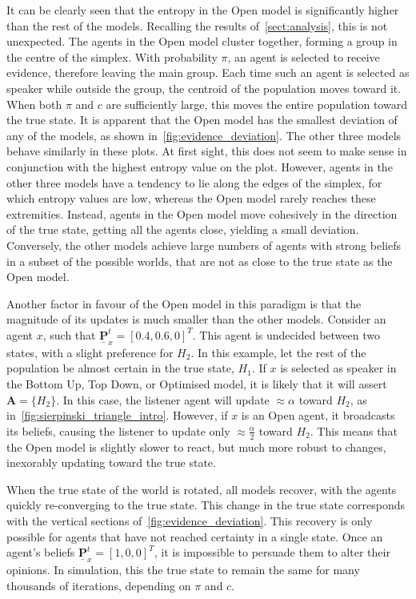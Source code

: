 It can be clearly seen that the entropy in the Open model is significantly higher than the rest of the models. Recalling the results of~\cref{sect:analysis}, this is not unexpected. The agents in the Open model cluster together, forming a group in the centre of the simplex. With probability $\pi$, an agent is selected to receive evidence, therefore leaving the main group. Each time such an agent is selected as speaker while outside the group, the centroid of the population moves toward it. When both $\pi$ and $c$ are sufficiently large, this moves the entire population toward the true state. It is apparent that the Open model has the smallest deviation of any of the models, as shown in~\cref{fig:evidence_deviation}. The other three models behave similarly in these plots. At first sight, this does not seem to make sense in conjunction with the highest entropy value on the plot. However, agents in the other three models have a tendency to lie along the edges of the simplex, for which entropy values are low, whereas the Open model rarely reaches these extremities. Instead, agents in the Open model move cohesively in the direction of the true state, getting all the agents close, yielding a small deviation. Conversely, the other models achieve large numbers of agents with strong beliefs in a subset of the possible worlds, that are not as close to the true state as the Open model. 

Another factor in favour of the Open model in this paradigm is that the magnitude of its updates is much smaller than the other models. Consider an agent $x$, such that $\underline{\mathbf{P}}^t_x = [0.4, 0.6, 0]^T$. This agent is undecided between two states, with a slight preference for $H_2$. In this example, let the rest of the population be almost certain in the true state, $H_1$. If $x$ is selected as speaker in the Bottom Up, Top Down, or Optimised model, it is likely that it will assert $\mathbf{A} = \{ H_2 \}$. In this case, the listener agent will update $\approx \alpha$ toward $H_2$, as in~\cref{fig:sierpinski_triangle_intro}. However, if $x$ is an Open agent, it broadcasts its beliefs, causing the listener to update only $\approx \frac{\alpha}{2}$ toward $H_2$. This means that the Open model is slightly slower to react, but much more robust to changes, inexorably updating toward the true state.  

When the true state of the world is rotated, all models recover, with the agents quickly re-converging to the true state. This change in the true state corresponds with the vertical sections of~\cref{fig:evidence_deviation}. This recovery is only possible for agents that have not reached certainty in a single state. Once an agent's beliefs $\underline{\mathbf{P}}_x^t = [1,0,0]^T$, it is impossible to persuade them to alter their opinions. In simulation, this the true state to remain the same for many thousands of iterations, depending on $\pi$ and $c$. 



